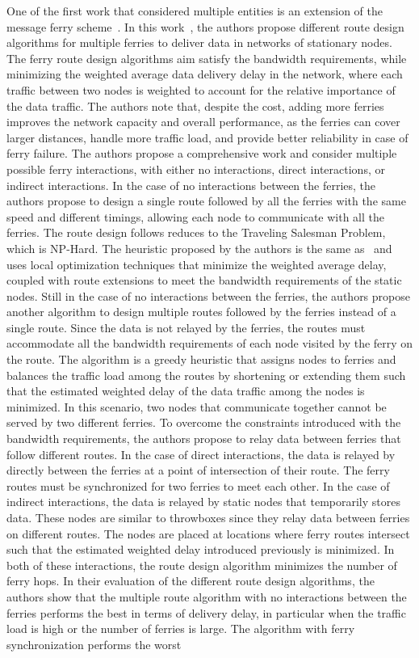 One of the first work that considered multiple entities is an extension of the message ferry scheme~\cite{zhao2003message,zhao2004message}. In this work~\cite{zhao2005controlling}, the authors propose different route design algorithms for multiple ferries to deliver data in networks of stationary nodes. The ferry route design algorithms aim satisfy the bandwidth requirements, while minimizing the weighted average data delivery delay in the network, where each traffic between two nodes is weighted to account for the relative importance of the data traffic. The authors note that, despite the cost, adding more ferries improves the network capacity and overall performance, as the ferries can cover larger distances, handle more traffic load, and provide better reliability in case of ferry failure. The authors propose a comprehensive work and consider multiple possible ferry interactions, with either no interactions, direct interactions, or indirect interactions. In the case of no interactions between the ferries, the authors propose to design a single route followed by all the ferries with the same speed and different timings, allowing each node to communicate with all the ferries. The route design follows reduces to the Traveling Salesman Problem, which is NP-Hard. The heuristic proposed by the authors is the same as~\cite{zhao2003message} and uses local optimization techniques that minimize the weighted average delay, coupled with route extensions to meet the bandwidth requirements of the static nodes. Still in the case of no interactions between the ferries, the authors propose another algorithm to design multiple routes followed by the ferries instead of a single route. Since the data is not relayed by the ferries, the routes must accommodate all the bandwidth requirements of each node visited by the ferry on the route. The algorithm is a greedy heuristic that assigns nodes to ferries and balances the traffic load among the routes by shortening or extending them such that the estimated weighted delay of the data traffic among the nodes is minimized. In this scenario, two nodes that communicate together cannot be served by two different ferries. To overcome the constraints introduced with the bandwidth requirements, the authors propose to relay data between ferries that follow different routes. In the case of direct interactions, the data is relayed by directly between the ferries at a point of intersection of their route. The ferry routes must be synchronized for two ferries to meet each other. In the case of indirect interactions, the data is relayed by static nodes that temporarily stores data. These nodes are similar to throwboxes since they relay data between ferries on different routes. The nodes are placed at locations where ferry routes intersect such that the estimated weighted delay introduced previously is minimized. In both of these interactions, the route design algorithm minimizes the number of ferry hops. In their evaluation of the different route design algorithms, the authors show that the multiple route algorithm with no interactions between the ferries performs the best in terms of delivery delay, in particular when the traffic load is high or the number of ferries is large. The algorithm with ferry synchronization performs the worst 